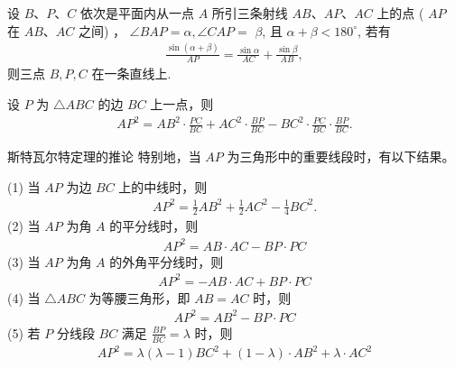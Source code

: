 \documentclass[aspectratio=169]{ctexbeamer}
\theoremstyle{definition}
\begin{document}
\begin{frame}[t]
	\begin{theorem}[张角定理的逆定理]
		设 $B、P、C$ 依次是平面内从一点 $A$ 所引三条射线 $A B、A P、A C$ 上的点 ( $A P$ 在 $A B、A C$ 之间) ， $\angle B A P=\alpha, \angle C A P=$ $\beta$, 且 $\alpha+\beta<180^{\circ}$, 若有
		\begin{align*}
			\frac{\sin (\alpha+\beta)}{A P}=\frac{\sin \alpha}{A C}+\frac{\sin \beta}{A B},
		\end{align*}
		则三点 $B, P, C$ 在一条直线上.
	\end{theorem}
\end{frame}

\begin{frame}[t]
	\begin{theorem}[斯特瓦尔特定理]
		设 $P$ 为 $\triangle A B C$ 的边 $B C$ 上一点，则
		\begin{align*}
			A P^{2}=A B^{2} \cdot \frac{P C}{B C}+A C^{2} \cdot \frac{B P}{B C}-B C^{2} \cdot \frac{P C}{B C} \cdot \frac{B P}{B C}. 
		\end{align*}
	\end{theorem}
\end{frame}

\begin{frame}[t]{斯特瓦尔特定理的推论}
	特别地，当 $A P$ 为三角形中的重要线段时，有以下结果。
	
	(1) 当 $A P$ 为边 $B C$ 上的中线时，则
	\begin{align*}
		A P^{2}=\frac{1}{2} A B^{2}+\frac{1}{2} A C^{2}-\frac{1}{4} B C^{2} .
	\end{align*}
	(2) 当 $A P$ 为角 $A$ 的平分线时，则
	\begin{align*}
		A P^{2}=A B \cdot A C-B P \cdot P C
	\end{align*}
	(3) 当 $A P$ 为角 $A$ 的外角平分线时，则
	\begin{align*}
		A P^{2}=-A B \cdot A C+B P \cdot P C
	\end{align*}
	(4) 当 $\triangle A B C$ 为等腰三角形，即 $A B=A C$ 时，则
	\begin{align*}
		A P^{2}=A B^{2}-B P \cdot P C
	\end{align*}
	(5) 若 $P$ 分线段 $B C$ 满足 $\frac{B P}{B C}=\lambda$ 时，则
	\begin{align*}
		A P^{2}=\lambda(\lambda-1) B C^{2}+(1-\lambda) \cdot A B^{2}+\lambda \cdot A C^{2}
	\end{align*}
\end{frame}
\end{document}

